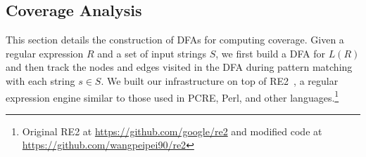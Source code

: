 






\subsection{Coverage Analysis}
\label{subsec:cov}
This section details the construction of DFAs for computing coverage. 
Given a regular expression $R$ and a set of input strings $S$, we first build a DFA for $L(R)$  and then track the nodes and edges visited in the DFA during pattern matching with each string $s \in S$. We built our  infrastructure on top of RE2~\cite{re2}, a regular expression engine similar to those used in PCRE, Perl, and other languages.\footnote{Original RE2 at \url{https://github.com/google/re2} and modified code at \url{https://github.com/wangpeipei90/re2}} %

